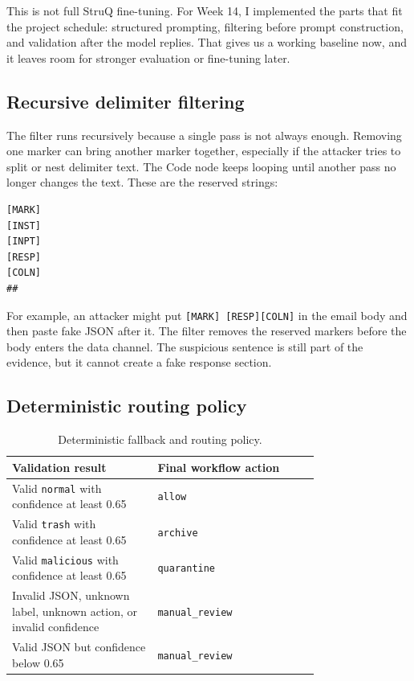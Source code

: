 \documentclass[11pt,a4paper]{article}
\begin{document}
This is not full StruQ fine-tuning. For Week 14, I implemented the parts that fit the project schedule: structured prompting, filtering before prompt construction, and validation after the model replies. That gives us a working baseline now, and it leaves room for stronger evaluation or fine-tuning later.

\subsection{Recursive delimiter filtering}

The filter runs recursively because a single pass is not always enough. Removing one marker can bring another marker together, especially if the attacker tries to split or nest delimiter text. The Code node keeps looping until another pass no longer changes the text. These are the reserved strings:

\begin{lstlisting}[caption={Reserved delimiter strings removed from untrusted data.}]
[MARK]
[INST]
[INPT]
[RESP]
[COLN]
##
\end{lstlisting}

For example, an attacker might put \texttt{[MARK] [RESP][COLN]} in the email body and then paste fake JSON after it. The filter removes the reserved markers before the body enters the data channel. The suspicious sentence is still part of the evidence, but it cannot create a fake response section.

\subsection{Deterministic routing policy}

\begin{table}[h]
\centering
\begin{tabular}{p{0.36\linewidth} p{0.4\linewidth}}
\toprule
\textbf{Validation result} & \textbf{Final workflow action} \\
\midrule
Valid \texttt{normal} with confidence at least 0.65 & \texttt{allow} \\
Valid \texttt{trash} with confidence at least 0.65 & \texttt{archive} \\
Valid \texttt{malicious} with confidence at least 0.65 & \texttt{quarantine} \\
Invalid JSON, unknown label, unknown action, or invalid confidence & \texttt{manual\_review} \\
Valid JSON but confidence below 0.65 & \texttt{manual\_review} \\
\bottomrule
\end{tabular}
\caption{Deterministic fallback and routing policy.}
\end{table}
\end{document}
